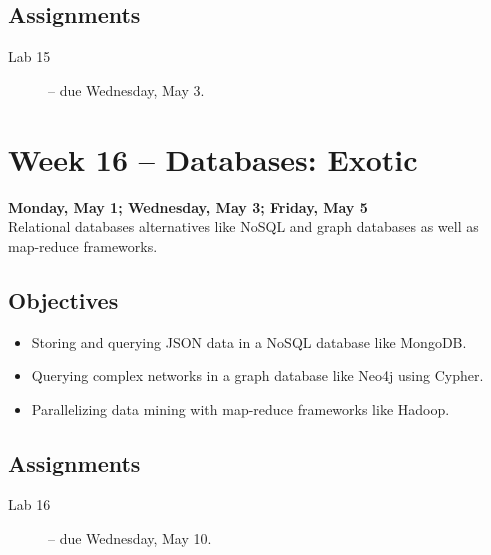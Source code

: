 \documentclass[10pt]{memoir}
\begin{document}
    \subsection{Assignments}
    \begin{description}
        \item[Lab 15 ] -- due Wednesday, May 3.
    \end{description}
    
\section{Week 16 -- Databases: Exotic}
\textcolor{CUGold}{\textbf{Monday, May 1; Wednesday, May 3; Friday, May 5}}\\
Relational databases alternatives like NoSQL and graph databases as well as map-reduce frameworks.

    \subsection{Objectives}
    \begin{itemize}
        \item Storing and querying JSON data in a NoSQL database like MongoDB.
        \item Querying complex networks in a graph database like Neo4j using Cypher.
        \item Parallelizing data mining with map-reduce frameworks like Hadoop.
    \end{itemize}

    \subsection{Assignments}
    \begin{description}
        \item[Lab 16 ] -- due Wednesday, May 10.
    \end{description}


\end{document}
